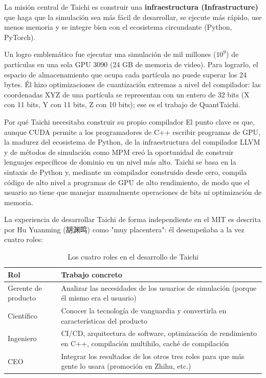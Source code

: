 La misión central de Taichi es construir una \textbf{infraestructura (Infrastructure)} que haga que la simulación sea más fácil de desarrollar, se ejecute más rápido, use menos memoria y se integre bien con el ecosistema circundante (Python, PyTorch).

Un logro emblemático fue ejecutar una simulación de mil millones ($10^9$) de partículas en una sola GPU 3090 (24 GB de memoria de video). Para lograrlo, el espacio de almacenamiento que ocupa cada partícula no puede superar los 24 bytes. Él hizo optimizaciones de cuantización extremas a nivel del compilador: las coordenadas XYZ de una partícula se representan con un entero de 32 bits (X con 11 bits, Y con 11 bits, Z con 10 bits); ese es el trabajo de QuantTaichi.

\begin{importantbox}{Por qué Taichi necesitaba construir su propio compilador}
El punto clave es que, aunque CUDA permite a los programadores de C++ escribir programas de GPU, la madurez del ecosistema de Python, de la infraestructura del compilador LLVM y de métodos de simulación como MPM creó la oportunidad de construir lenguajes específicos de dominio en un nivel más alto. Taichi se basa en la sintaxis de Python y, mediante un compilador construido desde cero, compila código de alto nivel a programas de GPU de alto rendimiento, de modo que el usuario no tiene que manejar manualmente operaciones de bits ni optimización de memoria.
\end{importantbox}

La experiencia de desarrollar Taichi de forma independiente en el MIT es descrita por Hu Yuanming (胡渊鸣) como "muy placentera": él desempeñaba a la vez cuatro roles:

\begin{table}[H]
\centering
\caption{Los cuatro roles en el desarrollo de Taichi}
\begin{tabular}{ll}
\toprule
\textbf{Rol} & \textbf{Trabajo concreto} \\
\midrule
Gerente de producto & Analizar las necesidades de los usuarios de simulación (porque él mismo era el usuario) \\
Científico & Conocer la tecnología de vanguardia y convertirla en características del producto \\
Ingeniero & CI/CD, arquitectura de software, optimización de rendimiento en C++, compilación multihilo, caché de compilación \\
CEO & Integrar los resultados de los otros tres roles para que más gente lo usara (promoción en Zhihu, etc.) \\
\bottomrule
\end{tabular}
\end{table}

